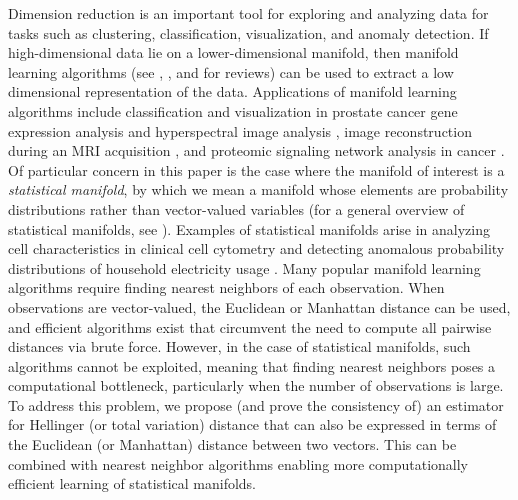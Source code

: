 \documentclass{article}
\begin{document}
Dimension reduction is an important tool for exploring and analyzing
data for tasks such as clustering, classification, visualization, and
anomaly detection. If high-dimensional data lie on a lower-dimensional
manifold, then manifold learning algorithms (see \citet{Cayton2005-dp},
\citet{Lee2007-wq}, and \citet{Izenman2012-mx} for reviews) can be used
to extract a low dimensional representation of the data. Applications of
manifold learning algorithms include classification and visualization in
prostate cancer gene expression analysis \citep{Witten2011-vq} and
hyperspectral image analysis \citep{Lunga2014-kc}, image reconstruction
during an MRI acquisition \citep{Zhu2018-jw}, and proteomic signaling
network analysis in cancer \citep{Banerjee2019-at}. Of particular
concern in this paper is the case where the manifold of interest is a
\emph{statistical manifold}, by which we mean a manifold whose elements
are probability distributions rather than vector-valued variables (for a
general overview of statistical manifolds, see \citet{Amari2016-hk}).
Examples of statistical manifolds arise in analyzing cell
characteristics in clinical cell cytometry \citep{Carter2009-ti} and
detecting anomalous probability distributions of household electricity
usage \citep{Hyndman2018-ia}. Many popular manifold learning algorithms
require finding nearest neighbors of each observation. When observations
are vector-valued, the Euclidean or Manhattan distance can be used, and
efficient algorithms exist that circumvent the need to compute all
pairwise distances via brute force. However, in the case of statistical
manifolds, such algorithms cannot be exploited, meaning that finding
nearest neighbors poses a computational bottleneck, particularly when
the number of observations is large. To address this problem, we propose
(and prove the consistency of) an estimator for Hellinger (or total
variation) distance that can also be expressed in terms of the Euclidean
(or Manhattan) distance between two vectors. This can be combined with
nearest neighbor algorithms enabling more computationally efficient
learning of statistical manifolds.
\end{document}
